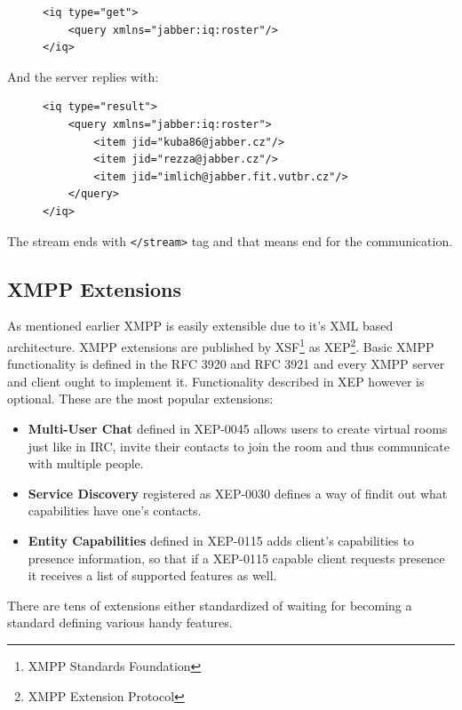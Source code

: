 \begin{figure}[h]
\begin{lstlisting}
<iq type="get">
	<query xmlns="jabber:iq:roster"/>
</iq>
\end{lstlisting}
\end{figure}

And the server replies with:

\begin{figure}[h]
\begin{lstlisting}
<iq type="result">
	<query xmlns="jabber:iq:roster">
		<item jid="kuba86@jabber.cz"/>
		<item jid="rezza@jabber.cz"/>
		<item jid="imlich@jabber.fit.vutbr.cz"/>
	</query>
</iq>
\end{lstlisting}
\end{figure}

The stream ends with \verb|</stream>| tag and that means end for the communication. 

\subsection*{XMPP Extensions}
As mentioned earlier XMPP is easily extensible due to it's XML based architecture. XMPP extensions are published by XSF\footnote{XMPP Standards Foundation} as XEP\footnote{XMPP Extension Protocol}. Basic XMPP functionality is defined in the RFC 3920 and RFC 3921 and every XMPP server and client ought to implement it. Functionality described in XEP however is optional. These are the most popular extensions:
\begin{itemize}
	\item{\bf Multi-User Chat} defined in XEP-0045 \cite{xepMUC} allows users to create virtual rooms just like in IRC, invite their contacts to join the room and thus communicate with multiple people.
	\item{\bf Service Discovery} registered as XEP-0030 \cite{xepServiceDiscovery} defines a way of findit out what capabilities have one's contacts.
	\item{\bf Entity Capabilities} defined in XEP-0115 \cite{xepCapabilitiesAdvertisement} adds client's capabilities to presence information, so that if a XEP-0115 capable client requests presence it receives a list of supported features as well.
\end{itemize}

There are tens of extensions either standardized of waiting for becoming a standard defining various handy features.

